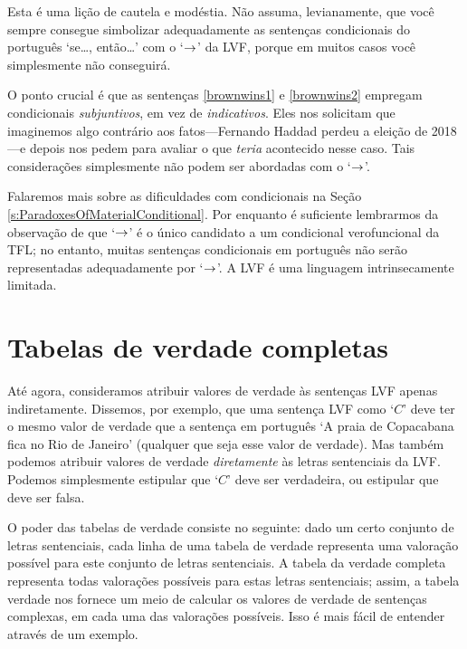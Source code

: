 Esta é uma lição de cautela e modéstia.
Não assuma, levianamente, que você sempre consegue simbolizar adequadamente as sentenças condicionais do português `se\ldots, então\ldots' com o `$\rightarrow$' da LVF, porque em muitos casos você simplesmente não conseguirá.

O ponto crucial é que as sentenças \ref{brownwins1} e \ref{brownwins2} empregam condicionais \emph{subjuntivos}, em vez de \emph{indicativos}.
Eles nos solicitam que imaginemos algo contrário aos fatos---Fernando Haddad perdeu a eleição de 2018---e depois nos pedem para avaliar o que \emph{teria} acontecido nesse caso.
Tais considerações simplesmente não podem ser abordadas com o  `$\rightarrow$'.

Falaremos mais sobre as dificuldades com condicionais na Seção \ref{s:ParadoxesOfMaterialConditional}.
Por enquanto é suficiente lembrarmos da observação de que `$\rightarrow$' é o único candidato a um condicional verofuncional da TFL; no entanto, muitas sentenças condicionais em português não serão representadas adequadamente por `$\rightarrow$'.
A LVF é uma linguagem intrinsecamente limitada.


\chapter{Tabelas de verdade completas}
\label{s:CompleteTruthTables}

Até agora, consideramos atribuir valores de verdade às sentenças LVF apenas indiretamente.
Dissemos, por exemplo, que uma sentença LVF como `$C$' deve ter o mesmo valor de verdade que a sentença em português `A praia de Copacabana fica no Rio de Janeiro' (qualquer que seja esse valor de verdade).
Mas também podemos atribuir valores de verdade \emph{diretamente} às letras sentenciais da LVF.
Podemos simplesmente estipular que `$C$' deve ser verdadeira, ou estipular que deve ser falsa.

O poder das tabelas de verdade consiste no seguinte:
dado um certo conjunto de letras sentenciais, cada linha de uma tabela de verdade representa uma valoração possível para este conjunto de letras sentenciais.
A tabela da verdade completa representa todas valorações possíveis para estas letras sentenciais; assim, a tabela verdade nos fornece um meio de calcular os valores de verdade de sentenças complexas, em cada uma das valorações possíveis.
Isso é mais fácil de entender através de um exemplo.

